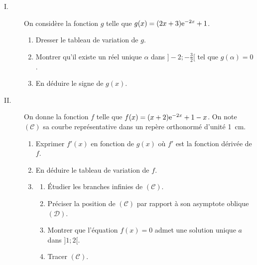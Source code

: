 \begin{exo}
      \begin{description}
            \item[I.] On consid\`ere la fonction $g$ telle que $g(x) = (2 x + 3) \mathrm{e}^{-2x} + 1$.
                  \begin{enumerate}
                        \item Dresser le tableau de variation de $g$.                                                                  
                        \item Montrer qu'il existe un r\'eel unique $\alpha$ dans $] -2 ; - \frac{3}{2} [$ 
                              tel que $g(\alpha) = 0$.      
                        \item En d\'eduire le signe de $g(x)$.                                                                         
                  \end{enumerate}
            \item[II.] On donne la fonction $f$ telle que $f(x) = (x+2) \mathrm{e}^{-2x} + 1 - x$.
                       On note $(\mathscr{C})$ sa courbe repr\'esentative dans un rep\`ere orthonorm\'e d'unit\'e 1~cm.
                  \begin{enumerate}
                        \item Exprimer $f'(x)$ en fonction de $g(x)$ o\`u $f'$ est la fonction d\'eriv\'ee de $f$.                    
                        \item En d\'eduire le tableau de variation de $f$.                                                             
                        \item \begin{enumerate}
                                    \item \'Etudier les branches infinies de $(\mathscr{C})$.                                                               
                                    \item Pr\'eciser la position de $(\mathscr{C})$ par rapport \`a son asymptote oblique $(\mathscr{D})$.                
                                    \item Montrer que l'\'equation $f(x) = 0$ admet une solution unique $a$ dans $]1 ; 2[$.                  
                                    \item Tracer $(\mathscr{C})$.                                                                                         
                              \end{enumerate}

\end{enumerate}
\end{description}
\end{exo}
